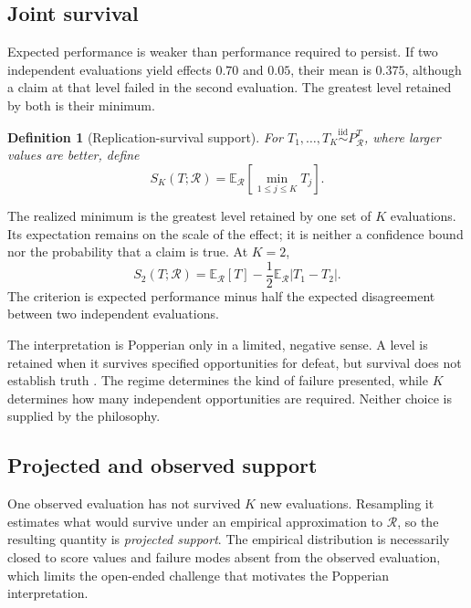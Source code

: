 \documentclass[11pt]{article}
\newcommand{\Regime}{\mathcal{R}}
\newcommand{\E}{\mathbb{E}}
\newcommand{\iid}{\mathrel{\overset{\mathrm{iid}}{\sim}}}
\newtheorem{definition}{Definition}
\theoremstyle{remark}
\begin{document}
\subsection{Joint survival}

Expected performance is weaker than performance required to persist. If two independent evaluations yield effects $0.70$ and $0.05$, their mean is $0.375$, although a claim at that level failed in the second evaluation. The greatest level retained by both is their minimum.

\begin{definition}[Replication-survival support]
For $T_1,\ldots,T_K\iid P_{\Regime}^{T}$, where larger values are better, define
\begin{equation}
S_K(T;\Regime)
=
\E_{\Regime}\left[
\min_{1\leq j\leq K}T_j
\right].
\label{eq:support}
\end{equation}
\end{definition}

The realized minimum is the greatest level retained by one set of $K$ evaluations. Its expectation remains on the scale of the effect; it is neither a confidence bound nor the probability that a claim is true. At $K=2$,
\begin{equation}
S_2(T;\Regime)
=
\E_{\Regime}[T]
-
\frac12\E_{\Regime}|T_1-T_2|.
\label{eq:k2}
\end{equation}
The criterion is expected performance minus half the expected disagreement between two independent evaluations.

The interpretation is Popperian only in a limited, negative sense. A level is retained when it survives specified opportunities for defeat, but survival does not establish truth \cite{popper1959logic,popper1963conjectures}. The regime determines the kind of failure presented, while $K$ determines how many independent opportunities are required. Neither choice is supplied by the philosophy.

\subsection{Projected and observed support}
\label{sec:projected}

One observed evaluation has not survived $K$ new evaluations. Resampling it estimates what would survive under an empirical approximation to $\Regime$, so the resulting quantity is \emph{projected support}. The empirical distribution is necessarily closed to score values and failure modes absent from the observed evaluation, which limits the open-ended challenge that motivates the Popperian interpretation.
\end{document}
